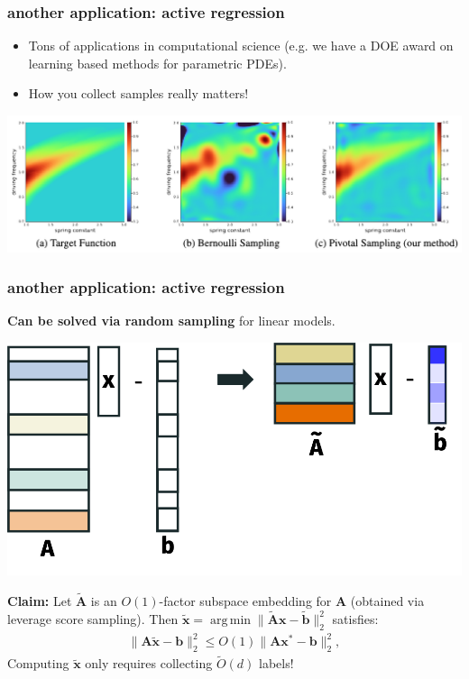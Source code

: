 \documentclass[compress]{beamer}
\newcommand{\bv}[1]{\mathbf{#1}}
\DeclareMathOperator*{\argmin}{arg\,min}
\begin{document}
\begin{frame}[t]
	\frametitle{another application: active regression}	
	\begin{itemize}
		\item Tons of applications in computational science (e.g. we have a DOE award on learning based methods for parametric PDEs). 
		\item How you collect samples really matters!
	\end{itemize}
	\begin{center}
		\includegraphics[width=\textwidth]{iclr_paper.png}
	\end{center}
\end{frame}

\begin{frame}[t]
	\frametitle{another application: active regression}	
	\textbf{Can be solved via random sampling} for linear models.
	\begin{center}
		\includegraphics[width=.6\textwidth]{active_regression.png}
	\end{center}

	\textbf{Claim:} Let $\tilde{\bv{A}}$ is an $O(1)$-factor subspace embedding for $\bv{A}$ (obtained via leverage score sampling). Then $\tilde{\bv{x}} = \argmin \|\tilde{\bv{A}}\bv{x} - \tilde{\bv{b}}\|_2^2$ satisfies:
\begin{align*}
	\|\bv{A}\tilde{\bv{x}} - \bv{b}\|_2^2 \leq O(1) \|\bv{A}\bv{x}^* - \bv{b}\|_2^2, 
\end{align*}
Computing $\tilde{\bv{x}}$ only requires collecting $\tilde{O}(d)$ labels!
\end{frame}	
\end{document}
